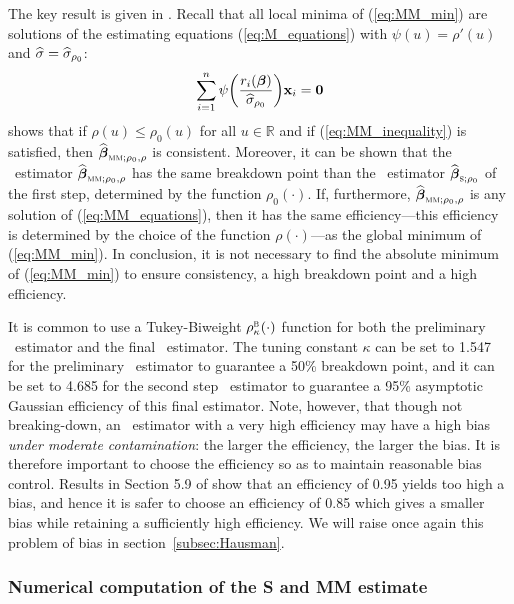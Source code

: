 The key result is given in \citet{yohai:1987}. Recall that all local minima of
(\ref{eq:MM_min}) are solutions of the estimating equations
(\ref{eq:M_equations}) with $\psi(u) = \rho'(u)$ and $\widehat{\sigma} =
\widehat{\sigma}_{\rho_0}$:
%
\begin{equation}\label{eq:MM_equations}
    \sum_{i=1}^{n} \psi\left(\frac{r_i(\boldsymbol\beta)}{\sthat{\sigma}_{\rho_0}}\right)
    \stvec{x}_i = \stvec{0}
\end{equation}
%
\citeauthor{yohai:1987} shows that if $\rho(u) \leq \rho_0(u)$ for all $u \in
\mathbb{R}$ and if (\ref{eq:MM_inequality}) is satisfied, then
$\sthat{\boldsymbol\beta}_{\stsc{MM};\rho_0,\rho}$ is consistent. Moreover,
it can be shown that the ~estimator
$\sthat{\boldsymbol\beta}_{\stsc{MM};\rho_0,\rho}$ has the same breakdown
point than the ~estimator
$\sthat{\boldsymbol\beta}_{\stsc{S};\rho_0}$ of the first step, determined by
the function $\rho_0(\cdot)$. If, furthermore,
$\sthat{\boldsymbol\beta}_{\stsc{MM};\rho_0,\rho}$ is any solution of
(\ref{eq:MM_equations}), then it has the same efficiency---this efficiency is
determined by the choice of the function $\rho(\cdot)$---as the global minimum
of (\ref{eq:MM_min}). In conclusion, it is not necessary to find the absolute
minimum of (\ref{eq:MM_min}) to ensure consistency, a high breakdown point and
a high efficiency.

It is common to use a Tukey-Biweight $\rho_{\kappa}^{\stsc{B}}(\cdot)$ function
for both the preliminary ~estimator and the final ~estimator.
The tuning constant $\kappa$ can be set to 1.547 for the preliminary 
~estimator to guarantee a 50\% breakdown point, and it can be set to 4.685 for
the second step ~estimator to guarantee a 95\% asymptotic Gaussian
efficiency of this final estimator. Note, however, that though not
breaking-down, an ~estimator with a very high efficiency may have a
high bias \emph{under moderate contamination}: the larger the efficiency, the
larger the bias. It is therefore important to choose the efficiency so as to
maintain reasonable bias control. Results in Section 5.9 of
\citet{maronna:etal:2006} show that an efficiency of 0.95 yields too high a
bias, and hence it is safer to choose an efficiency of 0.85 which gives a
smaller bias while retaining a sufficiently high efficiency. We will raise once
again this problem of bias in section~\ref{subsec:Hausman}.

\subsubsection{Numerical computation of the S and MM estimate}


